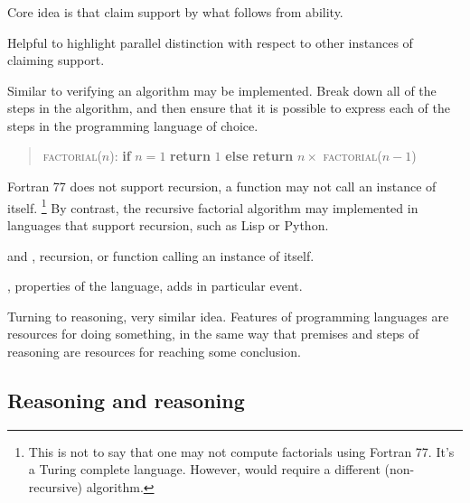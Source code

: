 \subsubsection{\adC{}}
\label{sec:adc}

\begin{note}
  Core idea is that claim support by what follows from ability.

  Helpful to highlight parallel distinction with respect to other instances of claiming support.
\end{note}

\begin{note}
  Similar to verifying an algorithm may be implemented.
  Break down all of the steps in the algorithm, and then ensure that it is possible to express each of the steps in the programming language of choice.

  \begin{quote}
    \textsc{factorial}(\(n\)):\newline
    \textbf{if} \(n = 1\)\newline
    \mbox{}\indent \textbf{return} \(1\)\newline
    \textbf{else}\newline
    \mbox{}\indent \textbf{return} \(n \times\) \textsc{factorial}(\(n-1\))
  \end{quote}

  Fortran 77 does not support recursion, a function may not call an instance of itself.\nolinebreak
  \footnote{
    This is not to say that one may not compute factorials using Fortran 77.
    It's a Turing complete language.
    However, would require a different (non-recursive) algorithm.
  }
  By contrast, the recursive factorial algorithm may implemented in languages that support recursion, such as Lisp or Python.

  \adS{} and \adC{}, recursion, or function calling an instance of itself.

  \AR{}, properties of the language, \WR{} adds in particular event.
\end{note}

\begin{note}
  Turning to reasoning, very similar idea.
  Features of programming languages are resources for doing something, in the same way that premises and steps of reasoning are resources for reaching some conclusion.
\end{note}

\subsection{Reasoning \nr{} and reasoning \ur{}}
\label{sec:reas-dd-reas}

